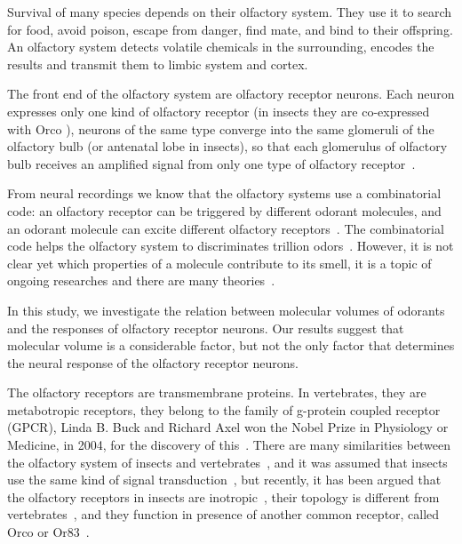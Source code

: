 \documentclass[11pt]{paper} %
\begin{document}
Survival of many species depends on their olfactory system. 
They use it  to search for food, 
avoid poison, 
escape from danger, 
find mate, 
and bind to their offspring.
An olfactory system detects volatile chemicals in the surrounding, 
encodes the results and transmit them to limbic system and cortex.

The front end of the olfactory system are olfactory receptor neurons.  
Each neuron expresses only one kind of olfactory receptor (in insects they are co-expressed with Orco \cite{Larsson2004}),
neurons of the same type converge into the same glomeruli of the olfactory bulb (or antenatal lobe in insects),
so that each glomerulus of olfactory bulb receives an amplified signal from only one type of olfactory receptor~\cite{Vosshall2000,Couto2005}.

From neural recordings we know that the olfactory systems use a combinatorial code: 
an olfactory receptor can be triggered by different odorant molecules, 
and an odorant molecule can excite different olfactory receptors~\cite{Malnic2000}.
The combinatorial code helps the olfactory system to discriminates trillion odors~\cite{Bushdid2014}.
However, it is not clear yet which properties of a molecule contribute to its smell,
it is a topic of ongoing researches and there are many theories~\cite{Turin,Keller2004,Araneda2000,Brookes2007,Franco2011,Pelz2006,Gabler2013,Schmuker2007,Haddad2008,Snitz2013,Yablonka2012}.

In this study, 
we investigate the relation between molecular volumes of odorants and the responses of olfactory receptor neurons. 
Our results suggest that molecular volume is a considerable factor, 
but not the only factor that determines the neural response of the olfactory receptor neurons.

The olfactory receptors are transmembrane proteins.
In vertebrates, they are metabotropic receptors, they belong to the family of g-protein coupled receptor (GPCR), 
Linda B. Buck and Richard Axel won the Nobel Prize in Physiology or Medicine, in 2004, 
for the discovery of this~\cite{Buck1991}.
There are many similarities between the olfactory system of insects and vertebrates~\cite{Wilson2014,Kaupp2010}, 
and it was assumed that insects use the same kind of signal transduction~\cite{Brody2000,Hill04102002}, 
but recently, it has been argued that the olfactory receptors in insects are inotropic~\cite{Sato2008,Wicher2008,Nagel2011,Rong2011}, 
their topology is different from vertebrates~\cite{Benton2007},
and they function in presence of another common receptor, called Orco or Or83~\cite{Larsson2004}.
\end{document}

